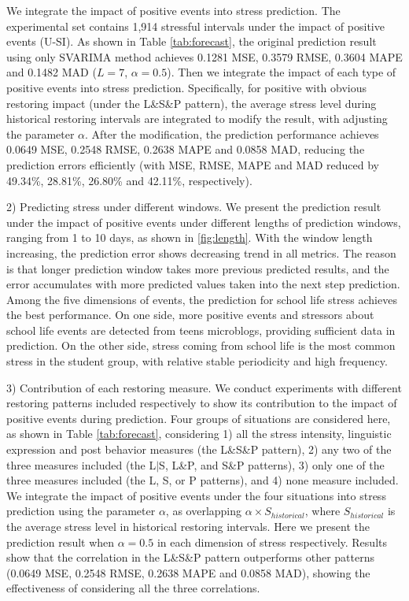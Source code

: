 We integrate the impact of positive events into stress prediction.
The experimental set contains 1,914 stressful intervals under the impact of positive events (U-SI).
As shown in Table \ref{tab:forecast},
the original prediction result using only SVARIMA method
achieves 0.1281 MSE, 0.3579 RMSE, 0.3604 MAPE and 0.1482 MAD ($L = 7$, $\alpha = 0.5$).
Then we integrate the impact of each type of positive events into stress prediction.
Specifically, for positive with obvious restoring impact (under the L\&S\&P pattern),
the average stress level during historical restoring intervals are integrated to modify the result,
with adjusting the parameter $\alpha$. 
After the modification,
the prediction performance achieves 0.0649 MSE,	0.2548 RMSE, 0.2638 MAPE and 0.0858 MAD,
reducing the prediction errors efficiently (with MSE, RMSE, MAPE and MAD reduced by 49.34\%, 28.81\%, 26.80\% and 42.11\%, respectively).

2) Predicting stress under different windows.
We present the prediction result under the impact of positive events under different lengths of prediction windows,
ranging from 1 to 10 days, as shown in \ref{fig:length}.
With the window length increasing,
the prediction error shows decreasing trend in all metrics.
The reason is that longer prediction window takes more previous predicted results,
and the error accumulates with more predicted values taken into the next step prediction.
Among the five dimensions of events,
the prediction for school life stress achieves the best performance.
On one side,
more positive events and stressors about school life events are detected from teens microblogs,
providing sufficient data in prediction.
On the other side,
stress coming from school life is the most common stress in the student group,
with relative stable periodicity and high frequency.

3) Contribution of each restoring measure.
We conduct experiments with different restoring patterns included respectively to show
its contribution to the impact of positive events during prediction.
Four groups of situations are considered here, as shown in Table \ref{tab:forecast},
considering
1) all the stress intensity, linguistic expression and post behavior measures (the L\&S\&P pattern),
2) any two of the three measures included (the L$|$S, L\&P, and S\&P patterns),
3) only one of the three measures included (the L, S, or P patterns),
and 4) none measure included.
We integrate the impact of positive events under the four situations into stress prediction
using the parameter $\alpha$,
as overlapping $\alpha \times S_{historical}$,
where $S_{historical}$ is the average stress level in historical restoring intervals.
Here we present the prediction result when $\alpha = 0.5$ in each dimension of stress respectively.
Results show that the correlation in the L\&S\&P pattern outperforms other patterns
(0.0649 MSE, 0.2548 RMSE, 0.2638 MAPE and 0.0858 MAD),
showing the effectiveness of considering all the three correlations.

